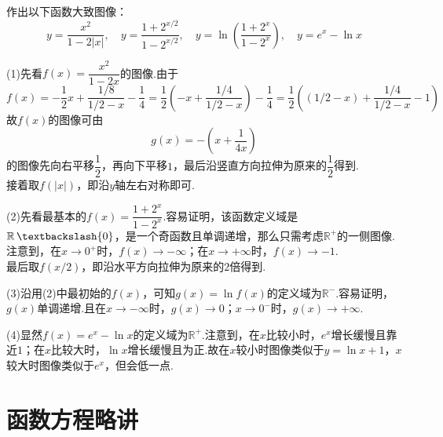 \documentclass[lang=cn, zihao=5]{elegantbook}
\newcommand{\ssb}[1]{\left( #1 \right)}
\newcommand{\R}{\mathbb{R}}
\DeclareMathOperator{\setjianfa}{\textbackslash}
\begin{document}
\begin{example}
	作出以下函数大致图像：$$y=\frac{x^2}{1-2|x|},\quad y=\frac{1+2^{x/2}}{1-2^{x/2}},\quad y=\ln \ssb{\frac{1+2^x}{1-2^x}},\quad y=e^x-\ln x$$
\end{example}
\begin{solution}
	(1)先看$f(x)=\dfrac{x^2}{1-2x}$的图像.由于$$f(x)=-\frac{1}{2}x+\frac{1/8}{1/2 - x} - \frac{1}{4} = \frac{1}{2} \ssb{-x+\frac{1/4}{1/2-x}} - \frac{1}{4} = \frac{1}{2} \ssb{(1/2-x)+\frac{1/4}{1/2-x}-1}$$
	故$f(x)$的图像可由$$g(x)=-\ssb{x+\dfrac{1}{4x}}$$
	的图像先向右平移$\dfrac{1}{2}$，再向下平移$1$，最后沿竖直方向拉伸为原来的$\dfrac{1}{2}$得到. \\
	接着取$f(|x|)$，即沿$y$轴左右对称即可.
	\begin{figure}[H]
		\centering
		
	\end{figure}
	
	\noindent
	(2)先看最基本的$f(x)=\dfrac{1+2^x}{1-2^x}$.容易证明，该函数定义域是$\R \setjianfa \{ 0 \}$，是一个奇函数且单调递增，那么只需考虑$\R ^+$的一侧图像.注意到，在$x \to 0^+$时，$f(x) \to -\infty$；在$x \to +\infty$时，$f(x) \to -1$. \\
	最后取$f(x/2)$，即沿水平方向拉伸为原来的$2$倍得到.
	\begin{figure}[H]
		\centering
		
	\end{figure}
	
	\noindent
	(3)沿用(2)中最初始的$f(x)$，可知$g(x)=\ln f(x)$的定义域为$\R ^-$.容易证明，$g(x)$单调递增.且在$x \to -\infty$时，$g(x) \to 0$；$x \to 0^-$时，$g(x) \to +\infty$.
	\begin{figure}[H]
		\centering
		
	\end{figure}
	
	\noindent
	(4)显然$f(x)=e^x-\ln x$的定义域为$\R ^+$.注意到，在$x$比较小时，$e^x$增长缓慢且靠近$1$；在$x$比较大时，$\ln x$增长缓慢且为正.故在$x$较小时图像类似于$y=\ln x+1$，$x$较大时图像类似于$e^x$，但会低一点.
	\begin{figure}[H]
		\centering
		
	\end{figure}
\end{solution}

\newpage
\section{函数方程略讲}
\end{document}
